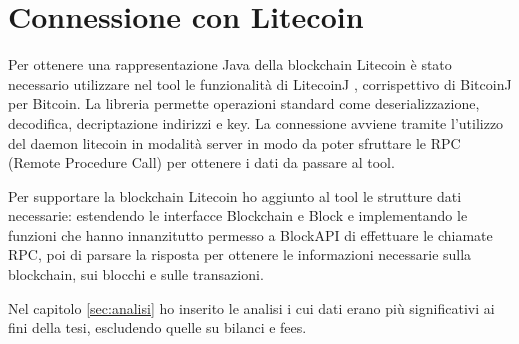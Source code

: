 \section{Connessione con Litecoin}
Per ottenere una rappresentazione Java della blockchain Litecoin è stato necessario utilizzare nel tool le funzionalità di LitecoinJ \cite{litecoinjgithub}, corrispettivo di BitcoinJ per Bitcoin. La libreria permette operazioni standard come deserializzazione, decodifica, decriptazione indirizzi e key.
La connessione avviene tramite l’utilizzo del daemon litecoin in modalità server in modo da poter sfruttare le RPC (Remote Procedure Call) per ottenere i dati da passare al tool.

Per supportare la blockchain Litecoin ho aggiunto al tool le strutture dati necessarie: estendendo le interfacce Blockchain e Block e implementando le funzioni che hanno innanzitutto permesso a BlockAPI di effettuare le chiamate RPC, poi di parsare la risposta per ottenere le informazioni necessarie sulla blockchain, sui blocchi e sulle transazioni.

Nel capitolo \ref{sec:analisi} ho inserito le analisi i cui dati erano più significativi ai fini della tesi, escludendo quelle su bilanci e fees.
